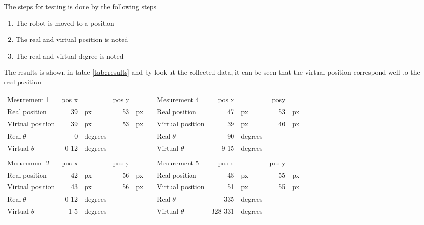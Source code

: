 The steps for testing is done by the following steps
\begin{enumerate}\itemsep-2pt
\item The robot is moved to a position
\item The real and virtual position is noted
\item The real and virtual degree is noted
\end{enumerate}
The results is shown in table \ref{tab::results} and by look at the collected data, it can be seen that the virtual position correspond well to the real position.

\begin{table}[H]
\begin{tabular}{|lrlrll|lrlrl|}
\rowcolor[HTML]{9B9B9B} 
Mesurement 1            & pos x &         & pos y &    &  & Mesurement 4            & pos x   &         & posy  &    \\
Real position           & 39    & px      & 53    & px &  & Real position           & 47      & px      & 53    & px \\
Virtual position        & 39    & px      & 53    & px &  & Virtual position        & 39      & px      & 46    & px \\
Real $\theta$    & 0     & degrees &       &    &  & Real $\theta$    & 90      & degrees &       &    \\
Virtual $\theta$ & 0-12  & degrees &       &    &  & Virtual $\theta$ & 9-15    & degrees &       &    \\
                        &       &         &       &    &  &                         &         &         &       &    \\
\rowcolor[HTML]{9B9B9B} 
Mesurement 2            & pos x &         & pos y &    &  & Mesurement 5            & pos x   &         & pos y &    \\
Real position           & 42    & px      & 56    & px &  & Real position           & 48      & px      & 55    & px \\
Virtual position        & 43    & px      & 56    & px &  & Virtual position        & 51      & px      & 55    & px \\
Real $\theta$    & 0-12  & degrees &       &    &  & Real $\theta$   & 335     & degrees &       &    \\
Virtual $\theta$& 1-5   & degrees &       &    &  & Virtual $\theta$ & 328-331 & degrees &       &    \\
                        &       &         &       &    &  &                         &         &         &       &    \\

\end{tabular}
\end{table}
